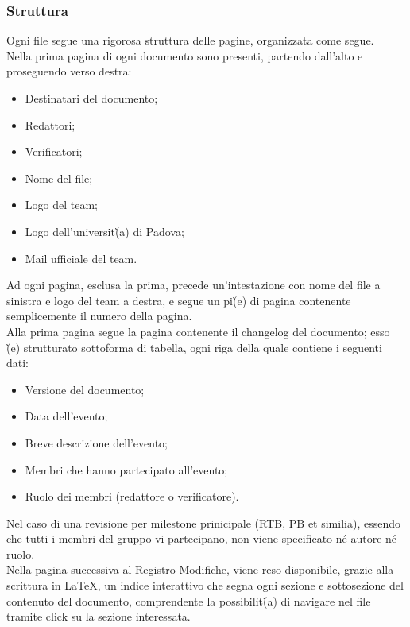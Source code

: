 \begin{itemize}
\subsubsection{Struttura}
Ogni file segue una rigorosa struttura delle pagine, organizzata come segue.
\\
Nella prima pagina di ogni documento sono presenti, partendo dall'alto e proseguendo verso destra:
\begin{itemize}
    \item Destinatari del documento;
    \item Redattori;
    \item Verificatori;
    \item Nome del file; 
    \item Logo del team;
    \item Logo dell'universit\`(a) di Padova;
    \item Mail ufficiale del team.
\end{itemize}
Ad ogni pagina, esclusa la prima, precede un'intestazione con nome del file a sinistra e logo del team a destra, e segue un pi\`(e) di pagina contenente semplicemente il numero della pagina. 
\\
Alla prima pagina segue la pagina contenente il changelog del documento; esso \`(e) strutturato sottoforma di tabella, ogni riga della quale contiene i seguenti dati:
\begin{itemize}
    \item Versione del documento;
    \item Data dell'evento;
    \item Breve descrizione dell'evento;
    \item Membri che hanno partecipato all'evento;
    \item Ruolo dei membri (redattore o verificatore).
\end{itemize}
Nel caso di una revisione per milestone prinicipale (RTB, PB et similia), essendo che tutti i membri del gruppo vi partecipano, non viene specificato né autore né ruolo. 
\\
Nella pagina successiva al Registro Modifiche, viene reso disponibile, grazie alla scrittura in \LaTeX, un indice interattivo che segna ogni sezione e sottosezione del contenuto del documento, comprendente la possibilit\`(a) di navigare nel file tramite click su la sezione interessata.
\\

\end{itemize}
